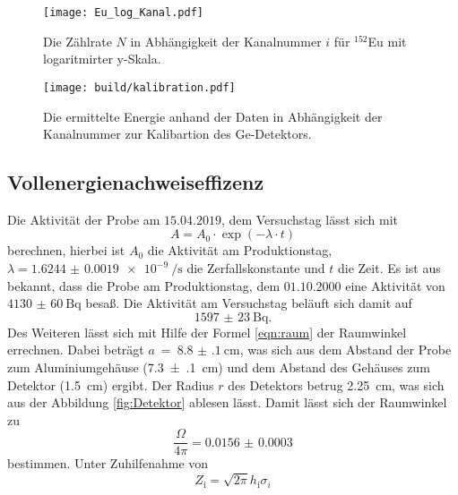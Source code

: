\begin{figure}[htb]
 \centering
 \texttt{[image: Eu\_log\_Kanal.pdf]}
 \caption{Die Zählrate $N$ in Abhängigkeit der Kanalnummer $i$ für ${}^{152}$Eu mit logaritmirter y-Skala.}
 \label{fig:Eu_log_Kanal}
\end{figure}

\begin{figure}[htb]
 \centering
 \texttt{[image: build/kalibration.pdf]}
 \caption{Die ermittelte Energie anhand der Daten in Abhängigkeit der Kanalnummer zur Kalibartion des Ge-Detektors.}
 \label{fig:kalibration}
\end{figure}


\FloatBarrier

\subsection{Vollenergienachweiseffizenz}
\label{sec:Vollenergienachweiseffizenz}
Die Aktivität der Probe am $15.04.2019$, dem Versuchstag lässt sich mit
\begin{equation}
  A = A_0 \cdot \exp{\left(-\lambda \cdot t\right)}
\end{equation}
berechnen, hierbei ist $A_0$ die Aktivität am Produktionstag,
$\lambda = \SI[per-mode = reciprocal-positive-first]{1.6244(19)e-9}{\per\second}$ \cite{referenz1} 
die Zerfallskonstante und $t$ die Zeit. Es ist aus \cite{V18} bekannt, dass die Probe am Produktionstag, dem
$01.10.2000$ eine Aktivität von $\SI{4130(60)}{\becquerel}$ besaß.
Die Aktivität am Versuchstag beläuft sich damit auf
\begin{equation*}
  \SI{1597(23)}{\becquerel}.
\end{equation*}
Des Weiteren lässt sich mit Hilfe der Formel \ref{eqn:raum} der Raumwinkel errechnen.
Dabei beträgt $a~=~\SI{8.8(1)}{\centi\meter}$, was sich aus dem Abstand der Probe zum
Aluminiumgehäuse (\SI{7.3(1)}{\centi\meter}) und dem Abstand des Gehäuses zum Detektor 
(\SI{1.5}{\centi\meter}) ergibt. Der Radius $r$ des Detektors betrug \SI{2.25}{\centi\meter}, was sich
aus der Abbildung \ref{fig:Detektor} ablesen lässt. Damit lässt sich der Raumwinkel zu
\begin{equation*}
  \frac{\Omega}{4\pi} = \num{0.0156(3)}
\end{equation*}
bestimmen.
Unter Zuhilfenahme von
\begin{equation}
  Z_\text{i} = \sqrt{2\pi} h_\text{i} \sigma_{i}
\end{equation}
